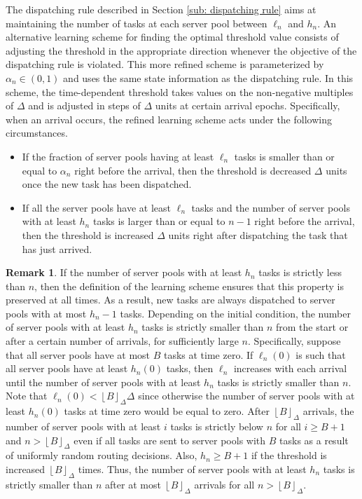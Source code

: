 \documentclass[a4paper, 12pt]{article}
\theoremstyle{definition}
\newtheorem{remark}{Remark}
\newcommand{\floor}[1]{\left\lfloor#1\right\rfloor}
\begin{document}
The dispatching rule described in Section \ref{sub: dispatching rule} aims at maintaining the number of tasks at each server pool between $\ell_n$ and $h_n$. An alternative learning scheme for finding the optimal threshold value consists of adjusting the threshold in the appropriate direction whenever the objective of the dispatching rule is violated. This more refined scheme is parameterized by $\alpha_n \in (0, 1)$ and uses the same state information as the dispatching rule. In this scheme, the time-dependent threshold takes values on the non-negative multiples of $\Delta$ and is adjusted in steps of $\Delta$ units at certain arrival epochs. Specifically, when an arrival occurs, the refined learning scheme acts under the following circumstances.
\begin{itemize}
	\item If the fraction of server pools having at least $\ell_n$ tasks is smaller than or equal to $\alpha_n$ right before the arrival, then the threshold is decreased $\Delta$ units once the new task has been dispatched.
	
	\item If all the server pools have at least $\ell_n$ tasks and the number of server pools with at least $h_n$ tasks is larger than or equal to $n - 1$ right before the arrival, then the threshold is increased $\Delta$ units right after dispatching the task that has just arrived.
\end{itemize}

\begin{remark}
	\label{rem: well positioned threahold}
	If the number of server pools with at least $h_n$ tasks is strictly less than $n$, then the definition of the learning scheme ensures that this property is preserved at all times. As a result, new tasks are always dispatched to server pools with at most $h_n - 1$ tasks. Depending on the initial condition, the number of server pools with at least $h_n$ tasks is strictly smaller than $n$ from the start or after a certain number of arrivals, for sufficiently large $n$. Specifically, suppose that all server pools have at most $B$ tasks at time zero. If $\ell_n(0)$ is such that all server pools have at least $h_n(0)$ tasks, then $\ell_n$ increases with each arrival until the number of server pools with at least $h_n$ tasks is strictly smaller than $n$. Note that $\ell_n(0) < \floor{B}_\Delta \Delta$ since otherwise the number of server pools with at least $h_n(0)$ tasks at time zero would be equal to zero. After $\floor{B}_\Delta$ arrivals, the number of server pools with at least $i$ tasks is strictly below $n$ for all $i \geq B + 1$ and $n > \floor{B}_\Delta$ even if all tasks are sent to server pools with $B$ tasks as a result of uniformly random routing decisions. Also, $h_n \geq B + 1$ if the threshold is increased $\floor{B}_\Delta$ times. Thus, the number of server pools with at least $h_n$ tasks is strictly smaller than $n$ after at most $\floor{B}_\Delta$ arrivals for all $n > \floor{B}_\Delta$.
\end{remark}
\end{document}
